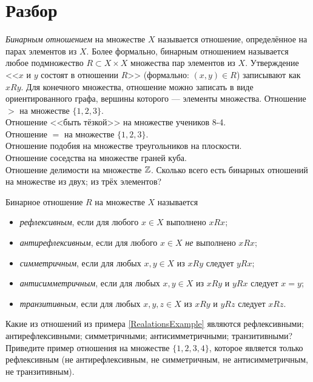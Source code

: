 \documentclass[a4paper,12pt]{article}
\begin{document}
    \iirules
    
    \section{Разбор}
     \emph{Бинарным отношением} на множестве $X$ называется отношение, определённое на парах элементов из $X$. Более формально, бинарным отношением называется любое подмножество $R \subset X \times X$ множества пар элементов из $X$. Утверждение <<$x$ и $y$ состоят в отношении $R$>> (формально: $(x,y) \in R$) записывают как $xRy$. Для конечного множества, отношение можно записать в виде ориентированного графа, вершины которого --- элементы множества.
    \example \label{RealationsExample} \sub Отношение $>$ на множестве $\{1,2,3\}$. \\
    \sub Отношение <<быть тёзкой>> на множестве учеников 8-4. \\
    \sub Отношение $=$ на множестве $\{1,2,3\}$. \\
    \sub Отношение подобия на множестве треугольников на плоскости. \\
    \sub Отношение соседства на множестве граней куба. \\
    \sub Отношение делимости на множестве $\mathbb{Z}$.
    \problem Сколько всего есть бинарных отношений на множестве \sub из двух; \sub из трёх элементов?
    
     Бинарное отношение $R$ на множестве $X$ называется
    \begin{itemize}
        \item \emph{рефлексивным}, если для любого $x \in X$ выполнено $xRx$;
        \item \emph{антирефлексивным}, если для любого $x \in X$ \textit{не} выполнено $xRx$;
        \item \emph{симметричным}, если для любых $x, y \in X$ из $xRy$ следует $yRx$;
        \item \emph{антисимметричным}, если для любых $x, y \in X$ из $xRy$ и $yRx$ следует $x=y$;
        \item \emph{транзитивным}, если для любых $x, y, z \in X$ из $xRy$ и $yRz$ следует $xRz$.
    \end{itemize}
    \problem Какие из отношений из примера \ref{RealationsExample} являются \sub рефлексивными; \sub антирефлексивными; \sub симметричными; \sub антисимметричными; \sub транзитивными?
    \problem Приведите пример отношения на множестве $\{1,2,3,4\}$, которое является только рефлексивным (не антирефлексивным, не симметричным, не антисимметричным, не транзитивным).
    
\end{document}
